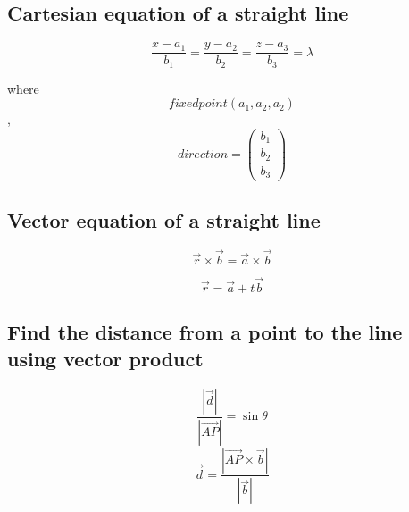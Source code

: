 \documentclass[a4paper,9pt]{scrartcl}
\newcommand{\vecabs}[1]{\left| \vec{#1} \right|}
\newcommand{\abs}[1]{\left| #1 \right|}
\begin{document}
    \subsection{Cartesian equation of a straight line}
    \begin{displaymath}
        \frac{x - a_1}{b_1} = \frac{y - a_2}{b_2} = \frac{z - a_3}{b_3} = \lambda
    \end{displaymath}

    where \begin{displaymath}
              fixed point (a_1, a_2, a_2)
    \end{displaymath},
    \begin{displaymath}
        direction = \begin{pmatrix}
                        b_1 \\ b_2 \\ b_3
        \end{pmatrix}
    \end{displaymath}

    \subsection{Vector equation of a straight line}
    \begin{displaymath}
        \vec{r}\times\vec{b} = \vec{a} \times \vec{b}
    \end{displaymath}

    \begin{displaymath}
        \vec{r} = \vec{a} + t\vec{b}
    \end{displaymath}

    \subsection{Find the distance from a point to the line using vector product}
    \begin{displaymath}
        \frac{\vecabs{d}}{\vecabs{AP}} = \sin\theta
    \end{displaymath}
    \begin{displaymath}
        \vec{d} = \frac{\abs{\vec{AP}\times\vec{b}}}{\vecabs{b}}
    \end{displaymath}
\end{document}
